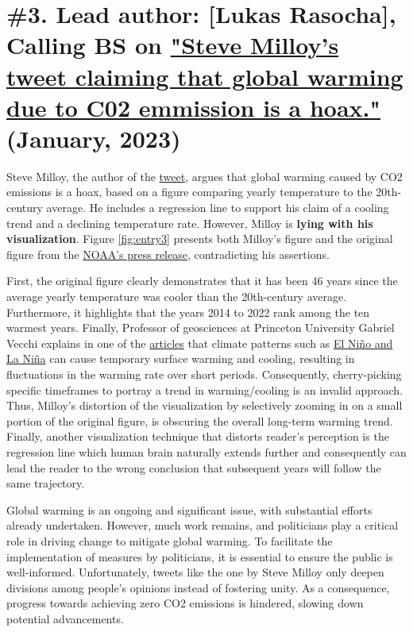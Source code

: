 \documentclass[fleqn,12pt]{article}
\begin{document}
\newpage

\section{\#3. Lead author: [Lukas Rasocha], Calling BS on \href{https://twitter.com/JunkScience/status/1613724250011242497?s=20}{"Steve Milloy's tweet claiming that global warming due to C02 emmission is a hoax."} (January, 2023)} 

Steve Milloy, the author of the \href{https://twitter.com/JunkScience/status/1613724250011242497?s=20}{tweet}, argues that global warming caused by CO2 emissions is a hoax, 
based on a figure comparing yearly temperature to the 20th-century average. He includes a regression line to support his claim of a cooling trend and a declining temperature rate. 
However, Milloy is \textbf{lying with his visualization}. Figure \ref{fig:entry3} presents both Milloy's figure and the original figure from the \href{https://www.noaa.gov/news/2022-was-worlds-6th-warmest-year-on-record}{NOAA's press release}, 
contradicting his assertions.

First, the original figure clearly demonstrates that it has been 46 years since the average yearly temperature was cooler than the 20th-century average. 
Furthermore, it highlights that the years 2014 to 2022 rank among the ten warmest years. Finally, Professor of geosciences at Princeton University Gabriel Vecchi explains in one of the \href{https://www.factcheck.org/2023/01/scicheck-viral-tweet-misrepresents-noaa-report-on-rising-global-temperature/}{articles} 
that climate patterns such as \href{https://oceanservice.noaa.gov/facts/ninonina.html}{El Niño and La Niña} can cause temporary surface warming and cooling, resulting in fluctuations in the warming rate over short periods. 
Consequently, cherry-picking specific timeframes to portray a trend in warming/cooling is an invalid approach. Thus, Milloy's distortion of the visualization by selectively zooming in on a small portion of the original figure, is obscuring 
the overall long-term warming trend. Finally, another visualization technique that distorts reader's perception is the regression line which human brain naturally extends further and consequently can lead the reader to the wrong conclusion that 
subsequent years will follow the same trajectory. 

Global warming is an ongoing and significant issue, with substantial efforts already undertaken. 
However, much work remains, and politicians play a critical role in driving change to mitigate global warming. 
To facilitate the implementation of measures by politicians, it is essential to ensure the public is well-informed. 
Unfortunately, tweets like the one by Steve Milloy only deepen divisions among people's opinions instead of fostering unity. 
As a consequence, progress towards achieving zero CO2 emissions is hindered, slowing down potential advancements.
\end{document}

